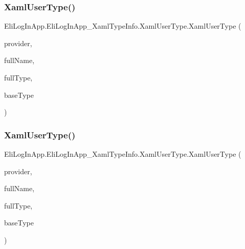 \subsubsection{\texorpdfstring{Xaml\+User\+Type()}{XamlUserType()}\hspace{0.1cm}{\footnotesize\ttfamily [2/3]}}
{\footnotesize\ttfamily Eli\+Log\+In\+App.\+Eli\+Log\+In\+App\+\_\+\+Xaml\+Type\+Info.\+Xaml\+User\+Type.\+Xaml\+User\+Type (\begin{DoxyParamCaption}\item[{global\+::\+Eli\+Log\+In\+App.\+Eli\+Log\+In\+App\+\_\+\+Xaml\+Type\+Info.\+Xaml\+Type\+Info\+Provider}]{provider,  }\item[{string}]{full\+Name,  }\item[{global\+::\+System.\+Type}]{full\+Type,  }\item[{global\+::\+Windows.\+U\+I.\+Xaml.\+Markup.\+I\+Xaml\+Type}]{base\+Type }\end{DoxyParamCaption})\hspace{0.3cm}{\ttfamily [inline]}}

\mbox{\label{class_eli_log_in_app_1_1_eli_log_in_app___xaml_type_info_1_1_xaml_user_type_aead17ccf55a45757a3f89915c58ff296}} 
\subsubsection{\texorpdfstring{Xaml\+User\+Type()}{XamlUserType()}\hspace{0.1cm}{\footnotesize\ttfamily [3/3]}}
{\footnotesize\ttfamily Eli\+Log\+In\+App.\+Eli\+Log\+In\+App\+\_\+\+Xaml\+Type\+Info.\+Xaml\+User\+Type.\+Xaml\+User\+Type (\begin{DoxyParamCaption}\item[{global\+::\+Eli\+Log\+In\+App.\+Eli\+Log\+In\+App\+\_\+\+Xaml\+Type\+Info.\+Xaml\+Type\+Info\+Provider}]{provider,  }\item[{string}]{full\+Name,  }\item[{global\+::\+System.\+Type}]{full\+Type,  }\item[{global\+::\+Windows.\+U\+I.\+Xaml.\+Markup.\+I\+Xaml\+Type}]{base\+Type }\end{DoxyParamCaption})\hspace{0.3cm}{\ttfamily [inline]}}



